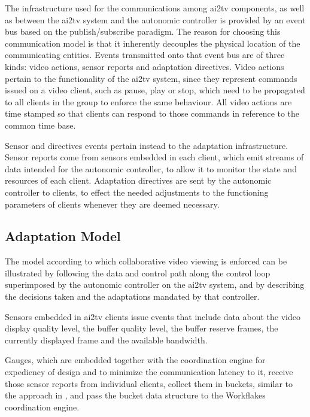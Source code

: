 \documentclass{sig-alternate}
\begin{document}
The infrastructure used for the communications among ai2tv components,
as well as between the ai2tv system and the autonomic controller is
provided by an event bus based on the publish/subscribe paradigm.  The
reason for choosing this communication model is that it inherently
decouples the physical location of the communicating entities.  Events
transmitted onto that event bus are of three kinds: video actions,
sensor reports and adaptation directives.  Video actions pertain to
the functionality of the ai2tv system, since they represent commands
issued on a video client, such as pause, play or stop, which need to
be propagated to all clients in the group to enforce the same
behaviour.  All video actions are time stamped so that clients can
respond to those commands in reference to the common time base.

Sensor and directives events pertain instead to the adaptation
infrastructure.  Sensor reports come from sensors embedded in each
client, which emit streams of data intended for the autonomic
controller, to allow it to monitor the state and resources of each
client.  Adaptation directives are sent by the autonomic controller to
clients, to effect the needed adjustments to the functioning
parameters of clients whenever they are deemed necessary.

\subsection{Adaptation Model}
The model according to which collaborative video viewing is enforced
can be illustrated by following the data and control path along the
control loop superimposed by the autonomic controller on the ai2tv
system, and by describing the decisions taken and the adaptations
mandated by that controller.

Sensors embedded in ai2tv clients issue events that include data about
the video display quality level, the buffer quality level, the buffer
reserve frames, the currently displayed frame and the available
bandwidth.
%

Gauges, which are embedded together with the coordination engine for
expediency of design and to minimize the communication latency to it,
receive those sensor reports from individual clients, collect them in
buckets, similar to the approach in \cite{MIMAZE}, and pass the bucket
data structure to the Workflakes coordination engine.
\end{document}
